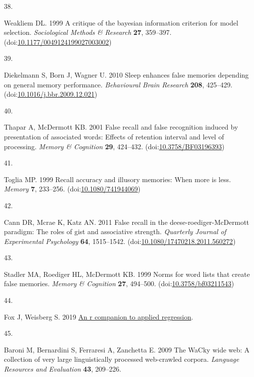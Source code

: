 \documentclass[
]{article}
\newlength{\cslhangindent}
\newlength{\csllabelwidth}
\newlength{\cslentryspacingunit} %
\newenvironment{CSLReferences}[2] %
 {%
  \setlength{\parindent}{0pt}
  \ifodd #1
  \let\oldpar\par
  \def\par{\hangindent=\cslhangindent\oldpar}
  \fi
  \setlength{\parskip}{#2\cslentryspacingunit}
 }%
 {}
\newcommand{\CSLLeftMargin}[1]{\parbox[t]{\csllabelwidth}{#1}}
\newcommand{\CSLRightInline}[1]{\parbox[t]{\linewidth - \csllabelwidth}{#1}\break}
\begin{document}
\begin{CSLReferences}{0}{0}
\leavevmode{}%
\CSLLeftMargin{38. }%
\CSLRightInline{Weakliem DL. 1999 A critique of the bayesian information criterion for model selection. \emph{Sociological Methods \& Research} \textbf{27}, 359--397. (doi:\href{https://doi.org/10.1177/0049124199027003002}{10.1177/0049124199027003002})}

\leavevmode{}%
\CSLLeftMargin{39. }%
\CSLRightInline{Diekelmann S, Born J, Wagner U. 2010 Sleep enhances false memories depending on general memory performance. \emph{Behavioural Brain Research} \textbf{208}, 425--429. (doi:\href{https://doi.org/10.1016/j.bbr.2009.12.021}{10.1016/j.bbr.2009.12.021})}

\leavevmode{}%
\CSLLeftMargin{40. }%
\CSLRightInline{Thapar A, McDermott KB. 2001 False recall and false recognition induced by presentation of associated words: Effects of retention interval and level of processing. \emph{Memory \& Cognition} \textbf{29}, 424--432. (doi:\href{https://doi.org/10.3758/BF03196393}{10.3758/BF03196393})}

\leavevmode{}%
\CSLLeftMargin{41. }%
\CSLRightInline{Toglia MP. 1999 Recall accuracy and illusory memories: When more is less. \emph{Memory} \textbf{7}, 233--256. (doi:\href{https://doi.org/10.1080/741944069}{10.1080/741944069})}

\leavevmode{}%
\CSLLeftMargin{42. }%
\CSLRightInline{Cann DR, Mcrae K, Katz AN. 2011 False recall in the deese-roediger-McDermott paradigm: The roles of gist and associative strength. \emph{Quarterly Journal of Experimental Psychology} \textbf{64}, 1515--1542. (doi:\href{https://doi.org/10.1080/17470218.2011.560272}{10.1080/17470218.2011.560272})}

\leavevmode{}%
\CSLLeftMargin{43. }%
\CSLRightInline{Stadler MA, Roediger HL, McDermott KB. 1999 Norms for word lists that create false memories. \emph{Memory \& Cognition} \textbf{27}, 494--500. (doi:\href{https://doi.org/10.3758/bf03211543}{10.3758/bf03211543})}

\leavevmode{}%
\CSLLeftMargin{44. }%
\CSLRightInline{Fox J, Weisberg S. 2019 \href{https://socialsciences.mcmaster.ca/jfox/Books/Companion/index.html}{An r companion to applied regression}. }

\leavevmode{}%
\CSLLeftMargin{45. }%
\CSLRightInline{Baroni M, Bernardini S, Ferraresi A, Zanchetta E. 2009 The WaCky wide web: A collection of very large linguistically processed web-crawled corpora. \emph{Language Resources and Evaluation} \textbf{43}, 209--226.}


\end{CSLReferences}
\end{document}
